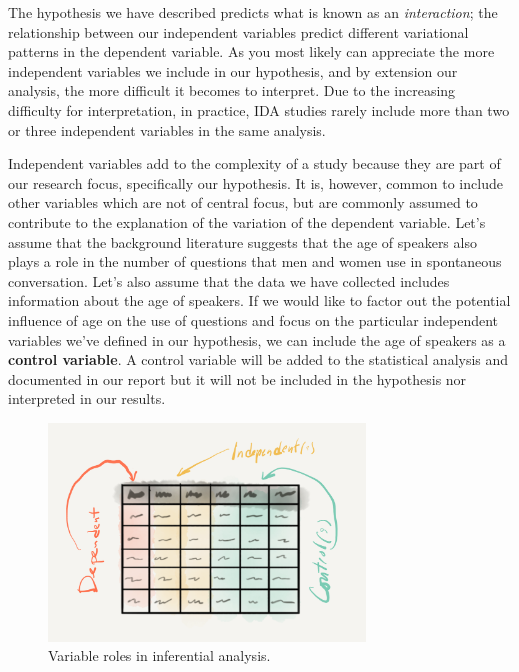 \documentclass[
  letterpaper,
]{latex/krantz}
\begin{document}
The hypothesis we have described predicts what is known as an
\emph{interaction}; the relationship between our independent variables
predict different variational patterns in the dependent variable. As you
most likely can appreciate the more independent variables we include in
our hypothesis, and by extension our analysis, the more difficult it
becomes to interpret. Due to the increasing difficulty for
interpretation, in practice, IDA studies rarely include more than two or
three independent variables in the same analysis.

Independent variables add to the complexity of a study because they are
part of our research focus, specifically our hypothesis. It is, however,
common to include other variables which are not of central focus, but
are commonly assumed to contribute to the explanation of the variation
of the dependent variable. Let's assume that the background literature
suggests that the age of speakers also plays a role in the number of
questions that men and women use in spontaneous conversation. Let's also
assume that the data we have collected includes information about the
age of speakers. If we would like to factor out the potential influence
of age on the use of questions and focus on the particular independent
variables we've defined in our hypothesis, we can include the age of
speakers as a \textbf{control variable}. A control variable will be
added to the statistical analysis and documented in our report but it
will not be included in the hypothesis nor interpreted in our results.

\begin{figure}[h]

{\centering \includegraphics[width=0.75\textwidth,height=\textheight]{figures/approaching-analysis/inferential-variables.png}

}

\caption{\label{fig-aa-inferential-variables}Variable roles in
inferential analysis.}

\end{figure}
\end{document}
